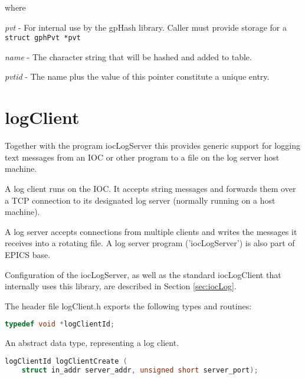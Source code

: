 where

\begin{description}
\item \emph{pvt} - For internal use by the gpHash library. Caller must provide storage for a \verb|struct gphPvt *pvt|

\item \emph{name} - The character string that will be hashed and added to table.

\item \emph{pvtid} - The name plus the value of this pointer constitute a unique entry.

\end{description}

\section{logClient}

Together with the program iocLogServer this provides generic support for logging text messages from an IOC or other 
program to a file on the log server host machine.

A log client runs on the IOC. It accepts string messages and forwards them over a TCP connection to its designated log 
server (normally running on a host machine).

A log server accepts connections from multiple clients and writes the messages it receives into a rotating file. A log server 
program ('iocLogServer') is also part of EPICS base.

Configuration of the iocLogServer, as well as the standard iocLogClient that internally uses this library, are described in Section \ref{sec:iocLog}.

The header file logClient.h exports the following types and routines:

\begin{lstlisting}[language=C]
typedef void *logClientId;
\end{lstlisting}

An abstract data type, representing a log client.

\begin{lstlisting}[language=C]
logClientId logClientCreate (
    struct in_addr server_addr, unsigned short server_port);
\end{lstlisting}

